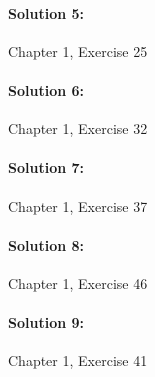 \documentclass[a4paper]{article}
\begin{document}
\paragraph{Solution 5:}
Chapter 1, Exercise 25

\paragraph{Solution 6:}
Chapter 1, Exercise 32

\paragraph{Solution 7:}
Chapter 1, Exercise 37

\paragraph{Solution 8:}
Chapter 1, Exercise 46

\paragraph{Solution 9:}
Chapter 1, Exercise 41
\end{document}

